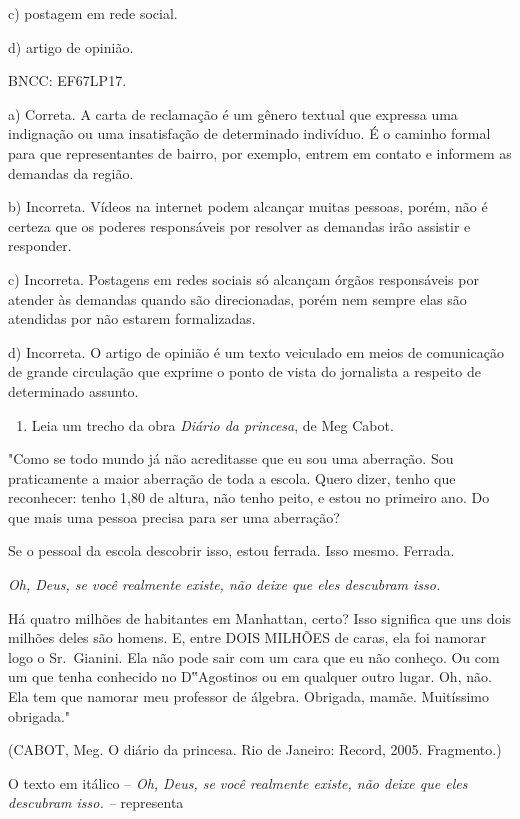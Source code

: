 c) postagem em rede social.

d) artigo de opinião.

BNCC: EF67LP17.

a) Correta. A carta de reclamação é um gênero textual que expressa uma
indignação ou uma insatisfação de determinado indivíduo. É o caminho
formal para que representantes de bairro, por exemplo, entrem em contato
e informem as demandas da região.

b) Incorreta. Vídeos na internet podem alcançar muitas pessoas, porém,
não é certeza que os poderes responsáveis por resolver as demandas irão
assistir e responder.

c) Incorreta. Postagens em redes sociais só alcançam órgãos responsáveis
por atender às demandas quando são direcionadas, porém nem sempre elas
são atendidas por não estarem formalizadas.

d) Incorreta. O artigo de opinião é um texto veiculado em meios de
comunicação de grande circulação que exprime o ponto de vista do
jornalista a respeito de determinado assunto.

\begin{enumerate}
\def\labelenumi{\arabic{enumi}.}
\setcounter{enumi}{14}
\tightlist
\item
  Leia um trecho da obra \emph{Diário da princesa}, de Meg Cabot.
\end{enumerate}

"Como se todo mundo já não acreditasse que eu sou uma aberração. Sou
praticamente a maior aberração de toda a escola. Quero dizer, tenho que
reconhecer: tenho 1,80 de altura, não tenho peito, e estou no primeiro
ano. Do que mais uma pessoa precisa para ser uma aberração?

Se o pessoal da escola descobrir isso, estou ferrada. Isso mesmo.
Ferrada.

\emph{Oh, Deus, se você realmente existe, não deixe que eles descubram
isso.}

Há quatro milhões de habitantes em Manhattan, certo? Isso significa que
uns dois milhões deles são homens. E, entre DOIS MILHÕES de caras, ela
foi namorar logo o Sr.~Gianini. Ela não pode sair com um cara que eu não
conheço. Ou com um que tenha conhecido no D‟Agostinos ou em qualquer
outro lugar. Oh, não. Ela tem que namorar meu professor de álgebra.
Obrigada, mamãe. Muitíssimo obrigada."

(CABOT, Meg. O diário da princesa. Rio de Janeiro: Record, 2005.
Fragmento.)

O texto em itálico -- \emph{Oh, Deus, se você realmente existe, não
deixe que eles descubram isso. --} representa

